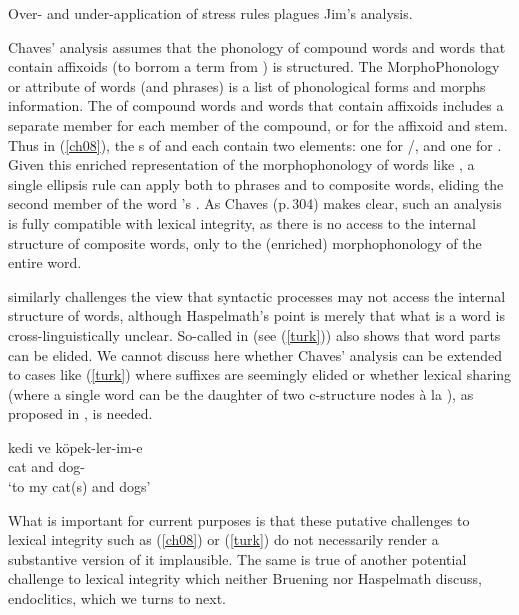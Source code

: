 \documentclass[output=paper]{langsci/langscibook}
\begin{document}
\begin{exe}
	\ex\label{ch08}Over- and under-application of stress rules plagues Jim's analysis.
\end{exe} 
Chaves' analysis assumes that the phonology of compound words and words that contain affixoids (to borrom a term from \citealt{Booij2005}) is structured. The MorphoPhonology or  attribute of words (and phrases) is a list of phonological forms and morphs information. The  of compound words and words that contain affixoids includes a separate member for each member of the compound, or for the affixoid and stem.  Thus in (\ref{ch08}), the s of  and  each contain two elements: one for /, and one for . Given this enriched representation of the morphophonology of words like , a single ellipsis rule can apply both to phrases and to composite words, eliding the second member of the word 's . As Chaves (p.\,304) makes clear, such an analysis is fully compatible with lexical integrity, as there is no access to the  internal structure of composite words, only to the (enriched) morphophonology of the entire word.

\citet{Haspelmath2011} similarly challenges the view that syntactic processes may not access the internal structure of words, although Haspelmath's point is merely that what is a word is cross-linguistically unclear. So-called  in (see (\ref{turk})) also shows that word parts can be elided. We cannot discuss here whether Chaves' analysis can be extended to cases like (\ref{turk}) where suffixes are seemingly elided or whether lexical sharing (where a single word can be the daughter of two c-structure nodes \`a la \citealt{McCawley1982}), as proposed in \citet{Broadwell2008}, is needed. 

\begin{exe}
	\ex\label{turk}
	\gll kedi ve köpek-ler-im-e \\
	cat and dog- \\
	\glt `to my cat(s) and dogs'	
\end{exe}

What is important for current purposes is that these putative challenges to lexical integrity such as (\ref{ch08}) or (\ref{turk}) do not necessarily render a substantive version of it implausible. The same is true of another potential challenge to lexical integrity which neither Bruening nor Haspelmath discuss, endoclitics, which we turns to next.
\end{document}
